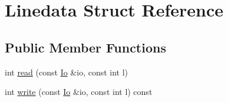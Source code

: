 \hypertarget{structLinedata}{}\section{Linedata Struct Reference}
\label{structLinedata}
\subsection*{Public Member Functions}
\begin{DoxyCompactItemize}
\item 
int \mbox{\hyperlink{structLinedata_af4cb38e89e417f7016608b7084223364}{read}} (const \mbox{\hyperlink{structIo}{Io}} \&io, const int l)
\item 
int \mbox{\hyperlink{structLinedata_a790d9790b8a7ac3c613bd4c27155135b}{write}} (const \mbox{\hyperlink{structIo}{Io}} \&io, const int l) const
\end{DoxyCompactItemize}
